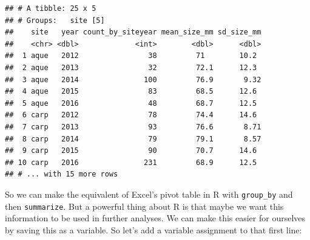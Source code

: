 \documentclass[]{book}
\newenvironment{Shaded}{\begin{snugshade}}{\end{snugshade}}
\newcommand{\DataTypeTok}[1]{\textcolor[rgb]{0.13,0.29,0.53}{#1}}
\newcommand{\KeywordTok}[1]{\textcolor[rgb]{0.13,0.29,0.53}{\textbf{#1}}}
\newcommand{\NormalTok}[1]{#1}
\newcommand{\OperatorTok}[1]{\textcolor[rgb]{0.81,0.36,0.00}{\textbf{#1}}}
\newcommand{\OtherTok}[1]{\textcolor[rgb]{0.56,0.35,0.01}{#1}}
\newcommand{\StringTok}[1]{\textcolor[rgb]{0.31,0.60,0.02}{#1}}
\begin{document}
\begin{Shaded}
\end{Shaded}

\begin{verbatim}
## # A tibble: 25 x 5
## # Groups:   site [5]
##    site   year count_by_siteyear mean_size_mm sd_size_mm
##    <chr> <dbl>             <int>        <dbl>      <dbl>
##  1 aque   2012                38         71        10.2 
##  2 aque   2013                32         72.1      12.3 
##  3 aque   2014               100         76.9       9.32
##  4 aque   2015                83         68.5      12.6 
##  5 aque   2016                48         68.7      12.5 
##  6 carp   2012                78         74.4      14.6 
##  7 carp   2013                93         76.6       8.71
##  8 carp   2014                79         79.1       8.57
##  9 carp   2015                90         70.7      14.6 
## 10 carp   2016               231         68.9      12.5 
## # ... with 15 more rows
\end{verbatim}

So we can make the equivalent of Excel's pivot table in R with \texttt{group\_by} and then \texttt{summarize}. But a powerful thing about R is that maybe we want this information to be used in further analyses. We can make this easier for ourselves by saving this as a variable. So let's add a variable assignment to that first line:

\begin{Shaded}
\end{Shaded}
\end{document}
